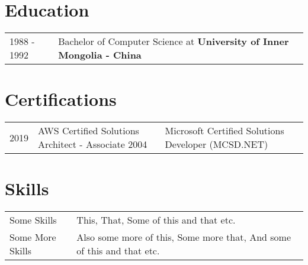 \documentclass[a4paper,12pt]{article}
\begin{document}
\section{Education}
\begin{tabularx}{\linewidth}{@{}l X@{}}	
1988 - 1992 & Bachelor of Computer Science at \textbf{University of Inner Mongolia - China} 
\end{tabularx}

\section{Certifications}
\begin{tabularx}{\linewidth}{@{}l X@{}}	
2019 & AWS Certified Solutions Architect - Associate
2004 & Microsoft Certified Solutions Developer (MCSD.NET) 
\end{tabularx}

\section{Skills}
\begin{tabularx}{\linewidth}{@{}l X@{}}
Some Skills &  \normalsize{This, That, Some of this and that etc.}\\
Some More Skills  &  \normalsize{Also some more of this, Some more that, And some of this and that etc.}\\  
\end{tabularx}

\vfill
{}
\end{document}
